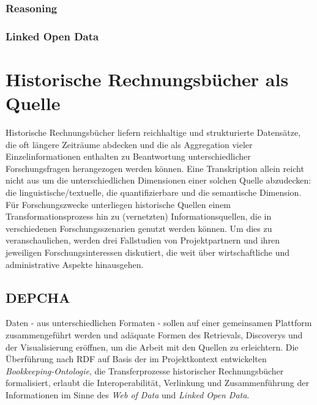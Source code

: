 \documentclass[12pt,a4paper]{article}
\begin{document}
\subsubsection{Reasoning}

\subsubsection{Linked Open Data}

\section{Historische Rechnungsbücher als Quelle}

Historische Rechnungsbücher liefern reichhaltige und strukturierte Datensätze, die oft längere Zeiträume abdecken und die als Aggregation vieler Einzelinformationen enthalten zu Beantwortung unterschiedlicher Forschungsfragen herangezogen werden können. Eine Transkription allein reicht nicht aus um die unterschiedlichen Dimensionen einer solchen Quelle abzudecken: die linguistische/textuelle, die quantifizierbare und die semantische Dimension. Für Forschungszwecke unterliegen historische Quellen einem Transformationsprozess hin zu (vernetzten) Informationsquellen, die in verschiedenen Forschungsszenarien genutzt werden können. Um dies zu veranschaulichen, werden drei Fallstudien von Projektpartnern und ihren jeweiligen Forschungsinteressen diskutiert, die weit über wirtschaftliche und administrative Aspekte hinausgehen.

\subsection{DEPCHA}

Daten - aus unterschiedlichen Formaten - sollen auf einer gemeinsamen Plattform zusammengeführt werden und adäquate Formen des Retrievals, Discoverys und der Visualisierung eröffnen, um die Arbeit mit den Quellen zu erleichtern. Die Überführung nach RDF auf Basis der im Projektkontext entwickelten \textit{Bookkeeping-Ontologie}, die Transferprozesse historischer Rechnungsbücher formalisiert, erlaubt die Interoperabilität, Verlinkung und Zusammenführung der Informationen im Sinne des \textit{Web of Data} und \textit{Linked Open Data}.
\end{document}
